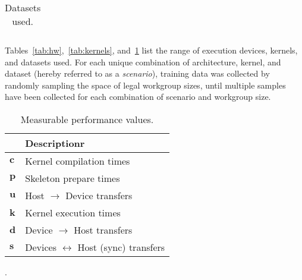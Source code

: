 \begin{table}
\footnotesize
\centering
\begin{tabular}{| l | l | l | l |}
\hline

\hline
\end{tabular}
\caption{%
  Datasets used.%
}
\label{tab:datasets}
\end{table}

Tables~\ref{tab:hw},~\ref{tab:kernels}, and~\ref{tab:datasets} list
the range of execution devices, kernels, and datasets used. For each
unique combination of architecture, kernel, and dataset (hereby
referred to as a \emph{scenario}), training data was collected by
randomly sampling the space of legal workgroup sizes, until multiple
samples have been collected for each combination of scenario and
workgroup size.


\begin{table}
\footnotesize
\centering
\begin{tabular}{| l | l |}
  \hline
  & \textbf{Descriptionr}\\
  \hline
  $\bm{c}$ & Kernel compilation times \\
  $\bm{p}$ & Skeleton prepare times \\
  $\bm{u}$ & Host $\rightarrow$ Device transfers \\
  $\bm{k}$ & Kernel execution times \\
  $\bm{d}$ & Device $\rightarrow$ Host transfers \\
  $\bm{s}$ & Devices $\leftrightarrow$ Host (sync) transfers \\
  \hline
\end{tabular}
\caption{Measurable performance values.}
\label{tab:metric}
\end{table}


.

